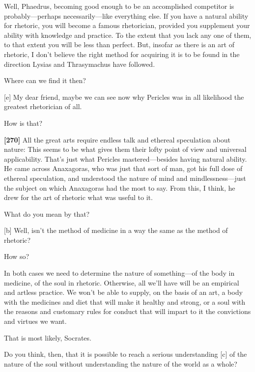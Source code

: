 \saysocrates Well, Phaedrus, becoming good enough to be an accomplished
competitor is probably---perhaps necessarily---like everything else. If
you have a natural ability for rhetoric, you will become a famous
rhetorician, provided you supplement your ability with knowledge and
practice. To the extent that you lack any one of them, to that extent
you will be less than perfect. But, insofar as there is an art of
rhetoric, I don't believe the right method for acquiring it is to be
found in the direction Lysias and Thrasymachus have followed.

\sayphaedrus Where can we find it then?

{[}e{]} \saysocrates My dear friend, maybe we can see now why Pericles was
in all likelihood the greatest rhetorician of all.

\sayphaedrus How is that?

{\bf {[}270{]}} \saysocrates All the great arts require endless talk and
ethereal speculation about nature: This seems to be what gives them
their lofty point of view and universal applicability. That's just what
Pericles mastered---besides having natural ability. He came across
Anaxagoras, who was just that sort of man, got his full dose of ethereal
speculation, and understood the nature of mind and
mindlessness---just
the subject on which Anaxagoras had the most to say. From this, I think,
he drew for the art of rhetoric what was useful to it.

\sayphaedrus What do you mean by that?

{[}b{]} \saysocrates Well, isn't the method of medicine in a way the same
as the method of rhetoric?

\sayphaedrus How so?

\saysocrates In both cases we need to determine the nature of
something---of the body in medicine, of the soul in rhetoric. Otherwise,
all we'll have will be an empirical and artless practice. We won't be
able to supply, on the basis of an art, a body with the medicines and
diet that will make it healthy and strong, or a soul with the reasons
and customary rules for conduct that will impart to it the convictions
and virtues we want.

\sayphaedrus That is most likely, Socrates.

\saysocrates Do you think, then, that it is possible to reach a serious
understanding {[}c{]} of the nature of the soul without understanding
the nature of the world as a whole?

